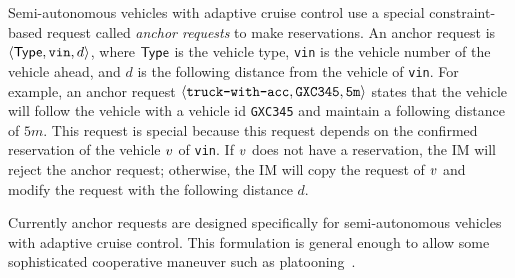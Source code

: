 Semi-autonomous vehicles with adaptive cruise control use a special
constraint-based request called \emph{anchor requests} to make
reservations. An anchor request is $\langle {\sf Type}, \texttt{vin},
d \rangle$, where ${\sf Type}$ is the vehicle type, \texttt{vin} is
the vehicle number of the vehicle ahead, and $d$ is the following
distance from the vehicle of \texttt{vin}.  For example, an anchor
request $\langle \texttt{truck-with-acc}, \texttt{GXC345}, {\tt 5m}
\rangle$ states that the vehicle will follow the vehicle with a
vehicle id {\tt GXC345} and maintain a following distance of $5m$.
This request is special because this request depends on the confirmed
reservation of the vehicle $v$ of \texttt{vin}. If $v$ does not
have a reservation, the IM will reject the anchor request; otherwise,
the IM will copy the request of $v$ and modify the request with the
following distance $d$.

Currently anchor requests are designed specifically for
semi-autonomous vehicles with adaptive cruise control.  This
formulation is general enough to allow some sophisticated cooperative
maneuver such as platooning~\cite{bib:Sheikholeslam90Longitudinal}.











